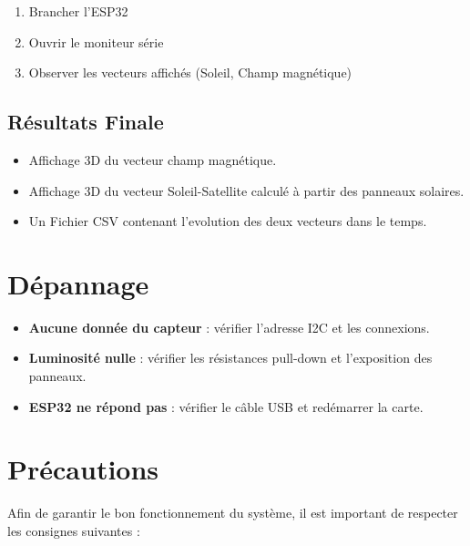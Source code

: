 \documentclass[a4paper,12pt]{article}
\begin{document}
\begin{enumerate}
    \item Brancher l’ESP32
    \item Ouvrir le moniteur série
    \item Observer les vecteurs affichés (Soleil, Champ magnétique)
\end{enumerate}

\subsection{Résultats Finale}

\begin{itemize}
    \item Affichage 3D du vecteur champ magnétique.
    \item Affichage 3D du vecteur Soleil-Satellite calculé à partir des panneaux solaires.
    \item Un Fichier CSV contenant l'evolution des deux vecteurs dans le temps.
\end{itemize}

\section{Dépannage}
\begin{itemize}
    \item \textbf{Aucune donnée du capteur} : vérifier l'adresse I2C et les connexions.
    \item \textbf{Luminosité nulle} : vérifier les résistances pull-down et l'exposition des panneaux.
    \item \textbf{ESP32 ne répond pas} : vérifier le câble USB et redémarrer la carte.
\end{itemize}

\newpage
\section{Précautions}

Afin de garantir le bon fonctionnement du système, il est important de respecter les consignes suivantes :\\[0.3cm]
\end{document}

